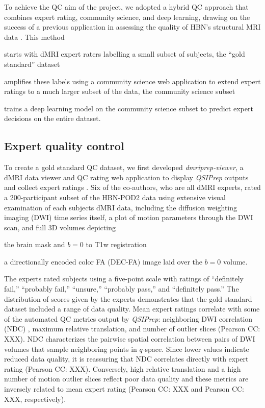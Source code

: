 \documentclass[fleqn,10pt]{wlscirep}
\begin{document}
To achieve the QC aim of the project, we adopted a hybrid QC approach that
combines expert rating, community science, and deep learning, drawing on the
success of a previous application in assessing the quality of HBN's structural
MRI data \cite{keshavan2019-er}. This method
\begin{enumerate*}[%
    label=(\roman*),%
    before={{ }},%
    itemjoin={{, }},%
    itemjoin*={{ and }}]
    \item starts with dMRI expert raters labelling a small subset of subjects,
    the ``gold standard'' dataset
    \item amplifies these labels using a community science web application to
    extend expert ratings to a much larger subset of the data, the community
    science subset
    \item trains a deep learning model on the community science subset to
    predict expert decisions on the entire dataset.
\end{enumerate*}

\subsection*{Expert quality control}

To create a gold standard QC dataset, we first developed \emph{dmriprep-viewer},
a dMRI data viewer and QC rating web application to display \emph{QSIPrep}
outputs and collect expert ratings \cite{richie-halford2021-viewer}. Six of the
co-authors, who are all dMRI experts, rated a 200-participant subset of the
HBN-POD2 data using extensive visual examination of each subjects dMRI data,
including the diffusion weighting imaging (DWI) time series itself, a plot of
motion parameters through the DWI scan, and full 3D volumes depicting
\begin{enumerate*}[%
    label=(\roman*),%
    before={{ }},%
    itemjoin={{, }},%
    itemjoin*={{ and }}]
    \item the brain mask and $b=0$ to T1w registration
    \item a directionally encoded color FA (DEC-FA) image laid over the $b=0$ volume.
\end{enumerate*}
The experts rated subjects using a five-point scale with ratings of ``definitely
fail,'' ``probably fail,'' ``unsure,'' ``probably pass,'' and ``definitely
pass.'' The distribution of scores given by the experts demonstrates that the
gold standard dataset included a range of data quality. Mean expert ratings
correlate with some of the automated QC metrics output by \emph{QSIPrep}:
neighboring DWI correlation (NDC) \cite{yeh2019-kb}, maximum relative
translation, and number of outlier slices (Pearson CC: XXX). NDC characterizes
the pairwise spatial correlation between pairs of DWI volumes that sample
neighboring points in $q$-space. Since lower values indicate reduced data
quality, it is reassuring that NDC correlates directly with expert rating
(Pearson CC: XXX). Conversely, high relative translation and a high number of
motion outlier slices reflect poor data quality and these metrics are inversely
related to mean expert rating (Pearson CC: XXX and Pearson CC: XXX,
respectively).
\end{document}
